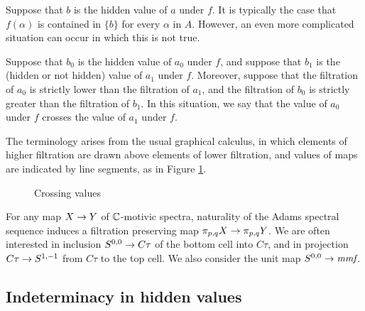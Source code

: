 Suppose that $b$ is the hidden value of $a$ under $f$.  
It is typically the case that $f(\alpha)$ is contained in $\{b\}$ for every
$\alpha$ in $A$.  However, an even more complicated situation can occur
in which this is not true.

Suppose that $b_0$ is the hidden value of $a_0$ under $f$, and suppose
that $b_1$ is the (hidden or not hidden) value of $a_1$ under $f$.
Moreover, suppose that the filtration of $a_0$ is strictly lower than
the filtration of $a_1$, and the filtration of $b_0$
is strictly greater than the filtration of $b_1$.
In this situation, we say that the value of $a_0$ under $f$ crosses
the value of $a_1$ under $f$.

The terminology arises from the usual graphical calculus, in which 
elements of higher filtration are drawn above elements of lower filtration,
and values of maps are indicated by line segments, as in 
Figure \ref{fig:crossing-values}.

\begin{figure}[h!]
\caption{Crossing values}
\label{fig:crossing-values}


\end{figure}



\begin{ex}
For any map $X \rightarrow Y$ of $\mathbb{C}$-motivic spectra, naturality of the
Adams spectral sequence induces a filtration preserving map
$\pi_{p,q} X \rightarrow \pi_{p,q} Y$.
We are often interested in 
inclusion $S^{0,0} \rightarrow C\tau$ of the
bottom cell into $C\tau$, and in
projection $C\tau \rightarrow S^{1,-1}$ from $C\tau$ to the top cell.
We also consider the unit map
$S^{0,0} \rightarrow \textit{mmf}$.
\end{ex}

\subsection{Indeterminacy in hidden values}
\label{subsctn:hid-indet}

